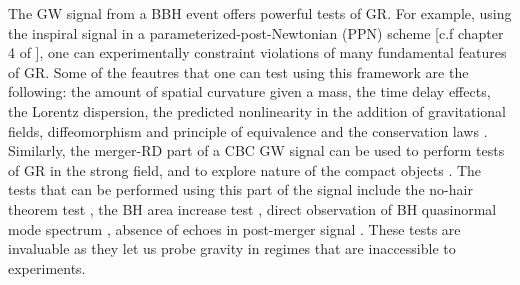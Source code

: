 The GW signal from a BBH event offers powerful tests of GR. For example, using the inspiral signal in a parameterized-post-Newtonian (PPN) scheme [c.f chapter 4 of \cite{CliffWills_book}], one can experimentally constraint violations of many fundamental features of GR. Some of the feautres that one can test using this framework are the following: the amount of spatial curvature given a mass, the time delay effects, the Lorentz dispersion, the predicted nonlinearity in the addition of gravitational fields, diffeomorphism and principle of equivalence and the conservation laws \cite{CliffWills_book}. Similarly, the merger-RD part of a CBC GW signal can be used to perform tests of GR in the strong field, and to explore nature of the compact objects \cite{Mazur:2000pn,misner1973gravitation,Dreyer,Gossan,Kamaretsos}. The tests that can be performed using  this part of the signal include the no-hair theorem test \cite{no-hair1,no-hair2}, the BH area increase test \cite{AreaIncreaseTheory1,AreaIncreaseTheory2}, direct observation of BH quasinormal mode spectrum \cite{lrr-1999-2,QNM-theory1 }, absence of echoes in post-merger signal \cite{echo1,echo2}. These tests are invaluable as they let us probe gravity in regimes that are inaccessible to experiments. 



